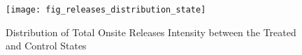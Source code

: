 \begin{figure}[H]
    \centering
    \texttt{[image: fig\_releases\_distribution\_state]}
    \caption{Distribution of Total Onsite Releases Intensity between the Treated and Control States}
    \label{fig:releases-distribution-states}
\end{figure}